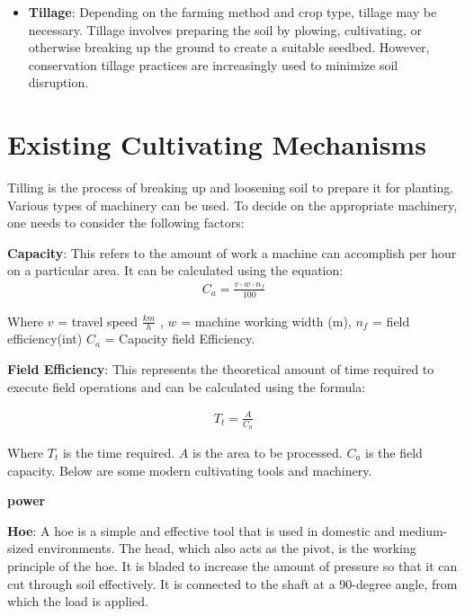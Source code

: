 \documentclass{article}
\begin{document}
\begin{flushleft}
\begin{itemize}
\item \textbf{Tillage}: Depending on the farming method and crop type, tillage may be necessary. Tillage involves preparing the soil by plowing, cultivating, or otherwise breaking up the ground to create a suitable seedbed. However, conservation tillage practices are increasingly used to minimize soil disruption.
\end{itemize}


\section*{Existing Cultivating Mechanisms}
Tilling is the process of breaking up and loosening soil to prepare it for planting. Various types of machinery can be used.
 To decide on the appropriate machinery, one needs to consider the following factors:
\newline

\textbf{Capacity}: This refers to the amount of work a machine can accomplish per hour on a particular area.
 It can be calculated using the equation:
 \begin{align*}
    C_{a} = \frac{v \cdot w \cdot n_f}{100} 
\end{align*}
\vspace*{2pt}

Where $v$ = travel speed $\frac{km}{h}$ , $w$ = machine working width (m), $n_f$ = field efficiency(int)
$C_a$ = Capacity field Efficiency.
\newline
\vspace*{2pt}

\textbf{Field Efficiency}: This represents the theoretical amount of time required to execute field operations and can be calculated using the formula:

\begin{align*}
T_t = \frac{A}{C_a}
\end{align*}


Where $T_t$ is the time required.
$A$ is the area to be processed.
$C_a$ is the field capacity.
Below are some modern cultivating tools and machinery.

\textbf{power}

\vspace*{5pt}

\textbf{Hoe}: A hoe is a simple and effective tool that is used in domestic and medium-sized environments. The head, which also acts as the pivot, is the working principle of the hoe. It is bladed to increase the amount of pressure so that it can cut through soil effectively. It is connected to the shaft at a 90-degree angle, from which the load is applied.
\newline


\end{flushleft}
\end{document}
